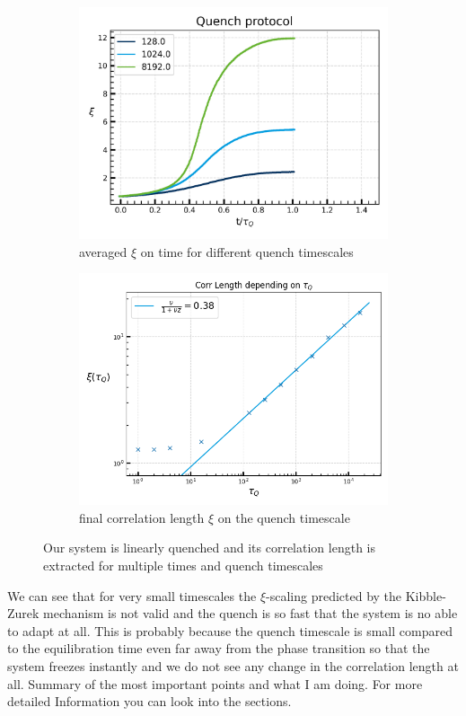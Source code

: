 	\begin{figure}[ht]
		\begin{subfigure}{0.5\textwidth}
			\centering
			\includegraphics[width=0.8\linewidth]{graphics/quench process.png}
			\caption{averaged ${\xi}$ on time for different quench timescales}
		\end{subfigure}
		\begin{subfigure}{0.5\textwidth}
			\centering
			\includegraphics[width=0.8\linewidth]{graphics/critical exponent z.png}
			\caption{final correlation length ${\xi}$ on the quench timescale}
		\end{subfigure}
		\caption{\label{Fig:z-Extraction}Our system is linearly quenched and its correlation length is extracted for multiple times and quench timescales}
	\end{figure}
	We can see that for very small timescales the $\xi$-scaling predicted by the Kibble-Zurek mechanism is not valid and the quench is so fast that the system is no able to adapt at all. This is probably because the quench timescale is small compared to the equilibration time even far away from the phase transition so that the system freezes instantly and we do not see any change in the correlation length at all.
	Summary of the most important points and what I am doing. For more detailed Information you can look into the sections.
	
